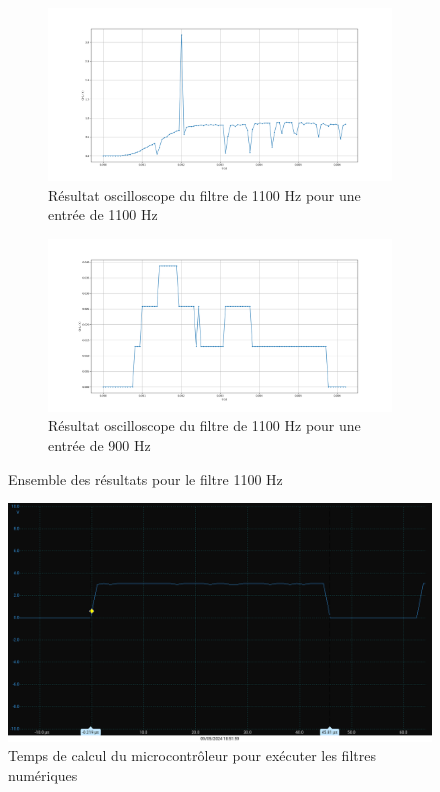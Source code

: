 \begin{figure}[H]
    \centering
\begin{subfigure}[b]{\textwidth}
    \centering
    \includegraphics[width=\textwidth]{Pictures/fil1100-1100.png}
    \caption{Résultat oscilloscope du filtre de 1100 Hz pour une entrée de 1100 Hz}
    \label{fig:1100-1100}
\end{subfigure}

\begin{subfigure}[b]{\textwidth}
    \centering
    \includegraphics[width=\textwidth]{Pictures/fil1100-900.png}
    \caption{Résultat oscilloscope du filtre de 1100 Hz pour une entrée de 900 Hz}
    \label{fig:1100-900}
\end{subfigure}

\caption{Ensemble des résultats pour le filtre 1100 Hz}
    \label{fig:filtre1100test}
\end{figure}

\begin{figure}[H]
    \centering
    \includegraphics[scale=0.35]{Pictures/TimeFIlter.png}
    \caption{Temps de calcul du microcontrôleur pour exécuter les filtres numériques}
    \label{fig:timefiltre}
\end{figure}

